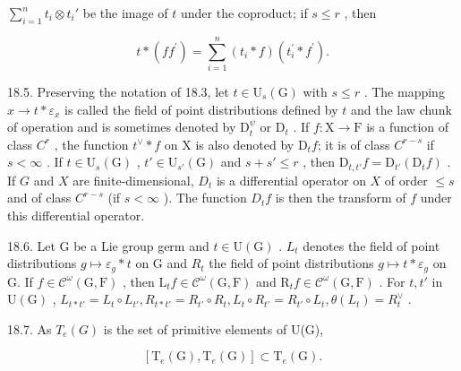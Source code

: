 \(\sum_{i=1}^{n} t_i \otimes t_i'\) be the image of \(t\) under the coproduct; if \(s \leqslant r\) , then

\[
t * (f f ^ {\prime}) = \sum_ {i = 1} ^ {n} (t _ {i} * f) (t _ {i} ^ {\prime} * f ^ {\prime}).
\]

18.5. Preserving the notation of 18.3, let \(t \in \mathrm{U}_s(\mathrm{G})\) with \(s \leqslant r\) . The mapping \(x \to t * \varepsilon_x\) is called the field of point distributions defined by \(t\) and the law chunk of operation and is sometimes denoted by \(\mathrm{D}_t^{\psi}\) or \(\mathrm{D}_t\) . If \(f: \mathrm{X} \to \mathrm{F}\) is a function of class \(C^r\) , the function \(t^{\vee} * f\) on \(\mathrm{X}\) is also denoted by \(\mathrm{D}_t f\); it is of class \(C^{r - s}\) if \(s < \infty\) . If \(t \in \mathrm{U}_s(\mathrm{G})\) , \(t' \in \mathrm{U}_{s'}(\mathrm{G})\) and \(s + s' \leqslant r\) , then \(\mathrm{D}_{t,t'} f = \mathrm{D}_{t'}(\mathrm{D}_t f)\) . If \(G\) and \(X\) are finite-dimensional, \(D_t\) is a differential operator on \(X\) of order \(\leqslant s\) and of class \(C^{r - s}\) (if \(s < \infty\) ). The function \(D_t f\) is then the transform of \(f\) under this differential operator.

18.6. Let G be a Lie group germ and \(t \in \mathrm{U}(\mathrm{G})\) . \(L_{t}\) denotes the field of point distributions \(g \mapsto \varepsilon_{g} * t\) on G and \(R_{t}\) the field of point distributions \(g \mapsto t * \varepsilon_{g}\) on G. If \(f \in \mathcal{C}^{\omega}(\mathrm{G}, \mathrm{F})\) , then \(\mathrm{L}_{t} f \in \mathcal{C}^{\omega}(\mathrm{G}, \mathrm{F})\) and \(\mathrm{R}_{t} f \in \mathcal{C}^{\omega}(\mathrm{G}, \mathrm{F})\) . For \(t, t'\) in \(\mathrm{U}(\mathrm{G})\) , \(L_{t* t'} = L_t \circ L_{t'}, R_{t* t'} = R_{t'} \circ R_t, L_t \circ R_{t'} = R_{t'} \circ L_t, \theta(L_t) = R_t^\vee\) .

18.7. As \(T_{e}(G)\) is the set of primitive elements of U(G),

\[
[ \mathrm{T} _ {e} (\mathrm{G}), \mathrm{T} _ {e} (\mathrm{G}) ] \subset \mathrm{T} _ {e} (\mathrm{G}).
\]

